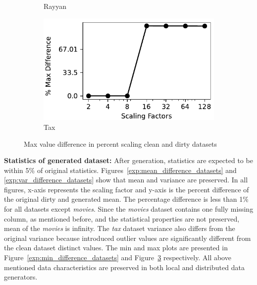 \begin{figure}[!ht]
\begin{subfigure}{0.32\textwidth}
    \caption{Rayyan}
    \label{exp:max_rayyan}
\end{subfigure}
\hfill
\begin{subfigure}{0.32\textwidth}
    \includegraphics[width=\textwidth]{figures/plot/max/max_diff_tax.pdf}
    \caption{Tax}
    \label{exp:max_tax}
\end{subfigure}
\hfill
\caption{Max value difference in percent scaling clean and dirty datasets}
\label{exp:max_difference_datasets}
\end{figure}

\textbf{Statistics of generated dataset:} 
After generation, statistics are expected to be within 5\% of original statistics.
Figures~\ref{exp:mean_difference_datasets} and \ref{exp:var_difference_datasets} show that mean and variance are preserved.
In all figures, x-axis represents the scaling factor and y-axis is the percent difference of the original dirty and generated mean.
The percentage difference is less than 1\% for all datasets except \textit{movies}.
Since the \textit{movies} dataset contains one fully missing column, as mentioned before, and the statistical properties are not preserved, mean of the \textit{movies} is infinity. 
The \textit{tax} dataset variance also differs from the original variance because introduced outlier values are significantly different from the clean dataset distinct values.
The min and max plots are presented in Figure~\ref{exp:min_difference_datasets} and Figure~\ref{exp:max_difference_datasets} respectively.
All above mentioned data characteristics are preserved in both local and distributed data generators.
